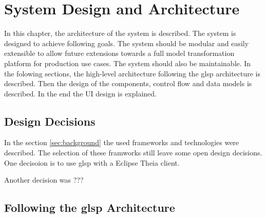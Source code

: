   \section{System Design and Architecture}
  \label{sec:system-design}

  In this chapter, the architecture of the system is described. The system is designed to achieve following goals. The system should be modular and easily extensible to allow future extensions towards a full model transformation platform for production use cases. The system should also be maintainable. In the folowing sections, the high-level architecture following the \ac{glsp} architecture is described. Then the design of the components, control flow and data models is described. In the end the UI design is explained.

  \subsection{Design Decisions}
  \label{subsec:design-decisions}

  In the section \ref{sec:background} the used frameworks and technologies were described. The selection of these framworks still leave some open design decisions. One decisoion is to use \ac{glsp} with a Eclipse Theia client. 

  Another decision was ???


  \subsection{Following the \ac{glsp} Architecture}
  \label{subsec:high-level-architecture}

